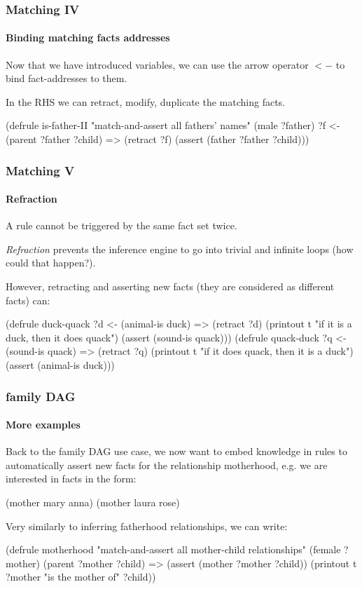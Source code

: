 \documentclass[xcolor={usenames,dvipsnames,svgnames}, compress]{beamer}
\begin{document}
\begin{frame}[fragile]
  \frametitle{Matching IV}
  \framesubtitle{Binding matching facts addresses}

  Now that we have introduced variables, we can use the arrow operator $<-$ to bind fact-addresses to
  them.\par\bigskip
  
  In the RHS we can \textsf{retract}, \textsf{modify}, \textsf{duplicate} the matching facts.
  \begin{clips-code}[numbers=none]
    (defrule is-father-II
        "match-and-assert all fathers' names"
        (male ?father)
        ?f <- (parent ?father ?child)
        =>
        (retract ?f)
        (assert (father ?father ?child)))
  \end{clips-code}
\end{frame}

\begin{frame}[fragile]
  \frametitle{Matching V}
  \framesubtitle{Refraction}

  A rule cannot be triggered by the same fact set twice.\par\bigskip
  
  \emph{Refraction} prevents the inference engine to go into trivial and
  infinite loops (how could that happen?).\par\bigskip

  However, retracting and asserting new facts (they are considered as different facts)
  can:
  \begin{clips-code}
    (defrule duck-quack
        ?d <- (animal-is duck)
        =>
        (retract ?d)
        (printout t "if it is a duck, then it does quack")
        (assert (sound-is quack)))
    (defrule quack-duck
        ?q <- (sound-is quack)
        =>
        (retract ?q)
        (printout t "if it does quack, then it is a duck")
        (assert (animal-is duck)))
  \end{clips-code}
\end{frame}

\begin{frame}[fragile]
  \frametitle{family DAG}
  \framesubtitle{More examples}
  Back to the family DAG use case, we now want to embed knowledge in
  rules to automatically assert new facts for the relationship
  motherhood, e.g. we are interested in
  facts in the form:
  \begin{clips-code}[numbers=none]
    (mother mary anna)    (mother laura rose)
  \end{clips-code}
  
  Very similarly to inferring fatherhood relationships, we can write:
  
  \begin{clips-code}[numbers=none]
    (defrule motherhood
        "match-and-assert all mother-child relationships"
        (female ?mother)
        (parent ?mother ?child)
        =>
        (assert (mother ?mother ?child))
        (printout t ?mother "is the mother of" ?child))
  \end{clips-code}
\end{frame}
\end{document}

